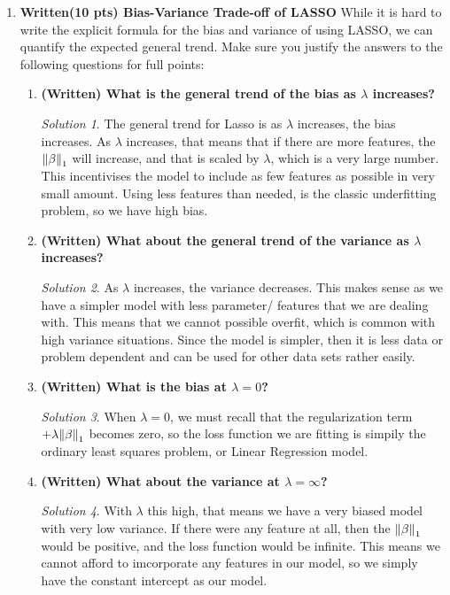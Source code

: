 \documentclass[a4paper,12pt]{article}
\theoremstyle{definition}
\theoremstyle{remark}
\newtheorem*{solution}{Solution}
\begin{document}
	\begin{enumerate}
		\item {\bf  Written(10 pts) Bias-Variance Trade-off of LASSO}
		While it is hard to write the explicit formula for the bias and variance of using LASSO, we can quantify the expected general trend. Make sure you justify the answers to the following questions for full points:
		\begin{enumerate}
			\item {\bf(Written) What is the general trend of the bias as $\lambda$ increases?}
			\begin{solution}
				The general trend for Lasso is as $\lambda$ increases, the bias increases. As $\lambda$ increases, that means that if there are more features, the $\norm{\beta}_1$ will increase, and that is scaled by $\lambda$, which is a very large number. This incentivises the model to include as few features as possible in very small amount. Using less features than needed, is the classic underfitting problem, so we have high bias. 
				
			\end{solution}
			\item {\bf (Written) What about the general trend of the variance as $\lambda$ increases?}
			\begin{solution}
				As $\lambda$ increases, the variance decreases. This makes sense as we have a simpler model with less parameter/ features that we are dealing with. This means that we cannot possible overfit, which is common with high variance situations. Since the model is simpler, then it is less data or problem dependent and can be used for other data sets rather easily.
			\end{solution}
			\item {\bf(Written) What is the bias at $\lambda = 0$?}
			\begin{solution}
				When $\lambda= 0$, we must recall that the regularization term $+\lambda\norm{\beta}_1$ becomes zero, so the loss function we are fitting is simpily the ordinary least squares problem, or Linear Regression model.
			\end{solution}
			\item {\bf(Written) What about the variance at $\lambda = \infty$?}
			\begin{solution}
				With $\lambda$ this high, that means we have a very biased model with very low variance. If there were any feature at all, then the $\norm{\beta}_1$ would be positive, and the loss function would be infinite. This means we cannot afford to imcorporate any features in our model, so we simply have the constant intercept as our model.
			\end{solution}
		\end{enumerate}
			

\end{enumerate}
\end{document}
